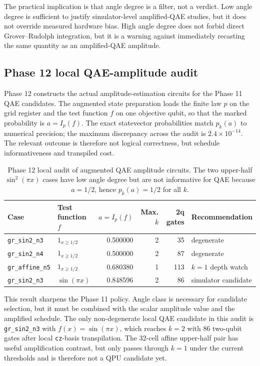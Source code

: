 The practical implication is that angle degree is a filter, not a verdict. Low
angle degree is sufficient to justify simulator-level amplified-QAE studies,
but it does not override measured hardware bias. High angle degree does not
forbid direct Grover--Rudolph integration, but it is a warning against
immediately recasting the same quantity as an amplified-QAE amplitude.

\subsection{Phase 12 local QAE-amplitude audit}

Phase 12 constructs the actual amplitude-estimation circuits for the Phase 11
QAE candidates. The augmented state preparation loads the finite law \(p\) on
the grid register and the test function \(f\) on one objective qubit, so that
the marked probability is \(a=I_p(f)\). The exact statevector probabilities
match \(p_k(a)\) to numerical precision; the maximum discrepancy across the
audit is \(2.4\times 10^{-14}\). The relevant outcome is therefore not logical
correctness, but schedule informativeness and transpiled cost.

\begin{table}[h]
\centering
\small
\begin{tabular}{llrrrl}
\toprule
Case & Test function \(f\) & \(a=I_p(f)\) & Max. \(k\) & 2q gates & Recommendation \\
\midrule
\texttt{gr\_sin2\_n3} & \(1_{x\ge1/2}\) & 0.500000 & 2 & 35 & degenerate \\
\texttt{gr\_sin2\_n4} & \(1_{x\ge1/2}\) & 0.500000 & 2 & 87 & degenerate \\
\texttt{gr\_affine\_n5} & \(1_{x\ge1/2}\) & 0.680380 & 1 & 113 & \(k=1\) depth watch \\
\texttt{gr\_sin2\_n3} & \(\sin(\pi x)\) & 0.848596 & 2 & 86 & simulator candidate \\
\bottomrule
\end{tabular}
\caption{Phase 12 local audit of augmented QAE amplitude circuits. The two
upper-half \(\sin^2(\pi x)\) cases have low angle degree but are not
informative for QAE because \(a=1/2\), hence \(p_k(a)=1/2\) for all \(k\).}
\label{tab:phase12-qae-amplitude-audit}
\end{table}

This result sharpens the Phase 11 policy. Angle class is necessary for
candidate selection, but it must be combined with the scalar amplitude value
and the amplified schedule. The only non-degenerate local QAE candidate in this
audit is \texttt{gr\_sin2\_n3} with \(f(x)=\sin(\pi x)\), which reaches
\(k=2\) with 86 two-qubit gates after local \texttt{cz}-basis transpilation.
The 32-cell affine upper-half pair has useful amplification contrast, but only
passes through \(k=1\) under the current thresholds and is therefore not a QPU
candidate yet.

